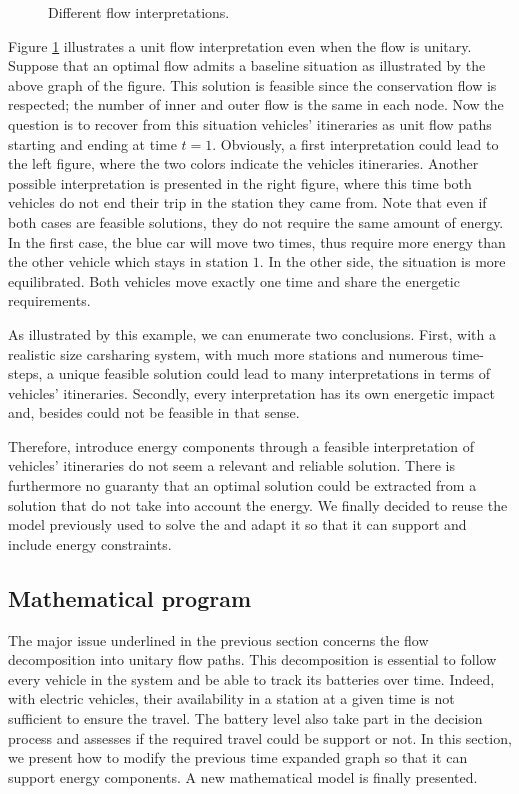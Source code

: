 \begin{bibunit}[ieeetr]
\begin{figure}[t]
\begin{center}

\end{center}
\caption{Different flow interpretations.}
\label{fig:flowInterpretation}
\end{figure}

\medskip
Figure \ref{fig:flowInterpretation} illustrates a unit flow interpretation even when the flow is unitary.
Suppose that an optimal flow admits a baseline situation as illustrated by the above graph of the figure.
This solution is feasible since the conservation flow is respected; the number of inner and outer flow is the same in each node.
Now the question is to recover from this situation vehicles' itineraries as unit flow paths starting and ending at time $t=1$.
Obviously, a first interpretation could lead to the left figure, where the two colors indicate the vehicles itineraries.
Another possible interpretation is presented in the right figure, where this time both vehicles do not end their trip in the station they came from.
Note that even if both cases are feasible solutions, they do not require the same amount of energy.
In the first case, the blue car will move two times, thus require more energy than the other vehicle which stays in station $1$.
In the other side, the situation is more equilibrated.
Both vehicles move exactly one time and share the energetic requirements.

\medskip
As illustrated by this example, we can enumerate two conclusions.
First, with a realistic size carsharing system, \ie with much more stations and numerous time-steps, a unique feasible solution could lead to many interpretations in terms of vehicles' itineraries.
Secondly, every interpretation has its own energetic impact and, besides could not be feasible in that sense. 

Therefore, introduce energy components through a feasible interpretation of vehicles' itineraries do not seem a relevant and reliable solution.
There is furthermore no guaranty that an optimal solution could be extracted from a solution that do not take into account the energy.
We finally decided to reuse the model previously used to solve the {\SLP} and adapt it so that it can support and include energy constraints.


\subsection{Mathematical program}
The major issue underlined in the previous section concerns the flow decomposition into unitary flow paths.
This decomposition is essential to follow every vehicle in the system and be able to track its batteries over time.
Indeed, with electric vehicles, their availability in a station at a given time is not sufficient to ensure the travel.
The battery level also take part in the decision process and assesses if the required travel could be support or not.
In this section, we present how to modify the previous time expanded graph so that it can support energy components.
A new mathematical model is finally presented.



\end{bibunit}
